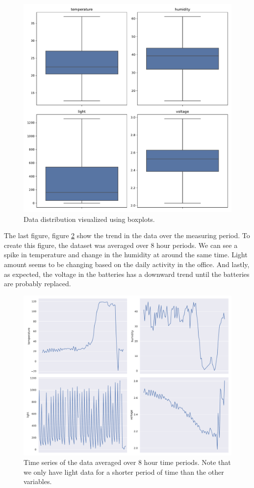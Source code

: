 \documentclass[a4paper,11pt]{article}
\begin{document}
		\begin{figure}[H]
			\centering
			\includegraphics[scale=0.5]{boxplots.pdf}
			\caption{Data distribution visualized using boxplots.}
			\label{figure:box}
		\end{figure}
	
		The last figure, figure \ref{figure:timeseries} show the trend in the data over the measuring period. To create this figure, the dataset was averaged over 8 hour periods.  We can see a spike in temperature and change in the humidity at around the same time. Light amount seems to be changing based on the daily activity in the office. And lastly, as expected, the voltage in the batteries has a downward trend until the batteries are probably replaced.
		\begin{figure}[H]
			\centering
			\includegraphics[scale=0.5]{timeseries.pdf}
			\caption{Time series of the data averaged over 8 hour time periods. Note that we only have light data for a shorter period of time than the other variables.}
			\label{figure:timeseries}
		\end{figure}
		
\end{document}
